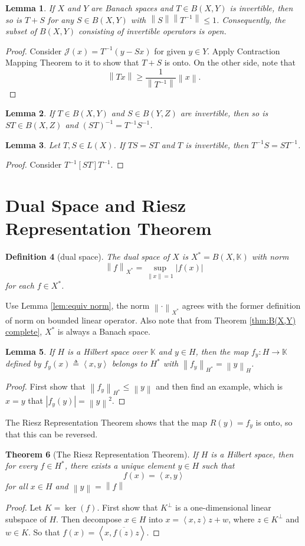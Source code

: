 \documentclass[12pt,a4paper]{report}
\numberwithin{equation}{section}
\theoremstyle{mystyle}
\newtheorem{definition}{Definition}[section]
\newtheorem{theorem}[definition]{Theorem}
\newtheorem{lemma}[definition]{Lemma}
\newcommand{\K}{\mathbb{K}}
\newcommand{\abs}[1]{\left\lvert #1 \right\rvert}
\newcommand{\norm}[1]{\left\lVert #1 \right\rVert}
\newcommand{\inner}[1]{\left\langle #1 \right\rangle}
\begin{document}
	\begin{lemma}
		If $X$ and $Y$ are Banach spaces and $T\in B(X,Y)$ is invertible, then so is $T+S$ for any $S\in B(X,Y)$ with $\norm{S}\norm{T^{-1}}\leq 1$. Consequently, the subset of $B(X,Y)$ consisting of invertible operators is open. \label{lem:invertible}
	\end{lemma}
	\begin{proof}
		Consider $\mathcal{J}(x)=T^{-1}(y-Sx)$ for given $y\in Y$. Apply Contraction Mapping Theorem to it to show that $T+S$ is onto. On the other side, note that 
		$$
		\norm{Tx}\geq \frac{1}{\norm{T^{-1}}}\norm{x}.
		$$
	\end{proof}

	\begin{lemma}
		If $T\in B(X,Y)$ and $S\in B(Y,Z)$ are invertible, then so is $ST\in B(X,Z)$ and $(ST)^{-1}=T^{-1}S^{-1}$.
	\end{lemma}
	\begin{lemma}
		Let $T,S\in L(X)$. If $TS=ST$ and $T$ is invertible, then $T^{-1}S=ST^{-1}$. 
	\end{lemma}
	\begin{proof}
		Consider $T^{-1}[ST]T^{-1}$.
	\end{proof}
	\section{Dual Space and Riesz Representation Theorem}
	\begin{definition}[dual space]
		The \emph{dual space} of $X$ is $X^*=B(X,\K)$ with norm
		$$
		\norm{f}_{X^*}=\sup_{\norm{x}=1}|f(x)|
		$$
		for each $f\in X^*$.
	\end{definition}
	Use Lemma \ref{lem:equiv norm}, the norm $\norm{\cdot}_{X^*}$ agrees with the former definition of norm on bounded linear operator. Also note that from Theorem \ref{thm:B(X,Y) complete}, $X^*$ is always a Banach space.
	\begin{lemma}
		If $H$ is a Hilbert space over $\K$ and $y\in H$, then the map $f_y:H\to\K$ defined by $f_y(x)\triangleq \inner{x,y}$ belongs to $H^*$ with $\norm{f_y}_{H^*}=\norm{y}_H$.
	\end{lemma}
	\begin{proof}
		First show that $\norm{f_y}_{H^*}\leq \norm{y}$ and then find an example, which is $x=y$ that $\abs{f_y(y)}=\norm{y}^2$.
	\end{proof}
	
	The Riesz Representation Theorem shows that the map $R(y)=f_y$ is onto, so that this can be reversed.
	\begin{theorem}[The Riesz Representation Theorem]
		If $H$ is a Hilbert space, then for every $f\in H^*$, there exists a unique element $y\in H$ such that
		$$
		f(x) = \inner{x,y}
		$$
		for all $x\in H$ and $\norm{y}=\norm{f}$
	\end{theorem}
	\begin{proof}
		Let $K=\ker(f)$. First show that $K^\perp$ is a one-dimensional linear subspace of $H$. Then decompose
		$x\in H$ into $x=\inner{x,z}z+w$, where $z\in K^\perp$ and $w\in K$. So that $f(x)=\inner{x,\overline{f(z)}z}$.
	\end{proof}
\end{document}
